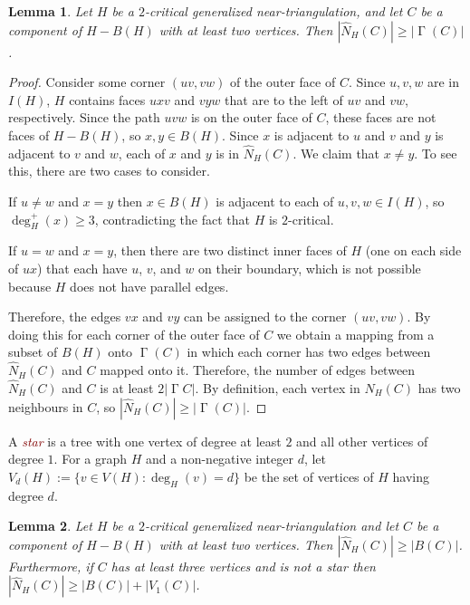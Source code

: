\documentclass[12pt]{article}
\newtheorem{lem}{Lemma}
\DeclareMathOperator{\corners}{\Gamma}
\newcommand{\defin}[1]{\emph{\textcolor{Maroon}{#1}}}
\theoremstyle{definition}
\begin{document}
\begin{lem}\label{corner_degree}
  Let $H$ be a $2$-critical generalized near-triangulation, and let $C$ be a component of $H-B(H)$ with at least two vertices. Then $|\widehat{N}_H(C)|\ge |\corners(C)|$.
\end{lem}

\begin{proof}
  Consider some corner $(uv, vw)$ of the outer face of $C$.  Since $u,v,w$ are in $I(H)$, $H$ contains faces $uxv$ and $vyw$ that are to the left of $uv$ and $vw$, respectively. Since the path $uvw$ is on the outer face of $C$, these faces are not faces of $H-B(H)$, so $x,y\in B(H)$.  Since $x$ is adjacent to $u$ and $v$ and $y$ is adjacent to $v$ and $w$, each of $x$ and $y$ is in $\widehat{N}_H(C)$.  We claim that $x\neq y$.  To see this, there are two cases to consider.
  \begin{compactenum}
    \item If $u\neq w$ and $x=y$ then $x\in B(H)$ is adjacent to each of $u,v,w\in I(H)$, so $\deg^+_H(x)\ge 3$, contradicting the fact that $H$ is $2$-critical.
    \item If $u=w$ and $x=y$, then there are two distinct inner faces of $H$ (one on each side of $ux$) that each have $u$, $v$, and $w$ on their boundary, which is not possible because $H$ does not have parallel edges.
  \end{compactenum}
  Therefore, the edges $vx$ and $vy$ can be assigned to the corner $(uv,vw)$. By doing this for each corner of the outer face of $C$ we obtain a mapping from a subset of $B(H)$ onto $\corners(C)$ in which each corner has two edges between $\widehat{N}_H(C)$ and $C$ mapped onto it.  Therefore, the number of edges between $\widehat{N}_H(C)$ and $C$ is at least $2|\corners{C}|$.  By definition, each vertex in $\widehat{N}_H(C)$ has two neighbours in $C$, so $|\widehat{N}_H(C)|\ge |\corners(C)|$.
\end{proof}

A \defin{star} is a tree with one vertex of degree at least $2$ and all other vertices of degree $1$.
For a graph $H$ and a non-negative integer $d$, let $V_d(H):=\{v\in V(H):\deg_H(v)=d\}$ be the set of vertices of $H$ having degree $d$.

\begin{lem}\label{degree_corners_and_leaves}
  Let $H$ be a $2$-critical generalized near-triangulation and let $C$ be a component of $H-B(H)$ with at least two vertices. Then $|\widehat{N}_H(C)|\ge |B(C)|$.  Furthermore, if $C$ has at least three vertices and is not a star then $|\widehat{N}_H(C)|\ge |B(C)| + |V_1(C)|$.
\end{lem}
\end{document}
